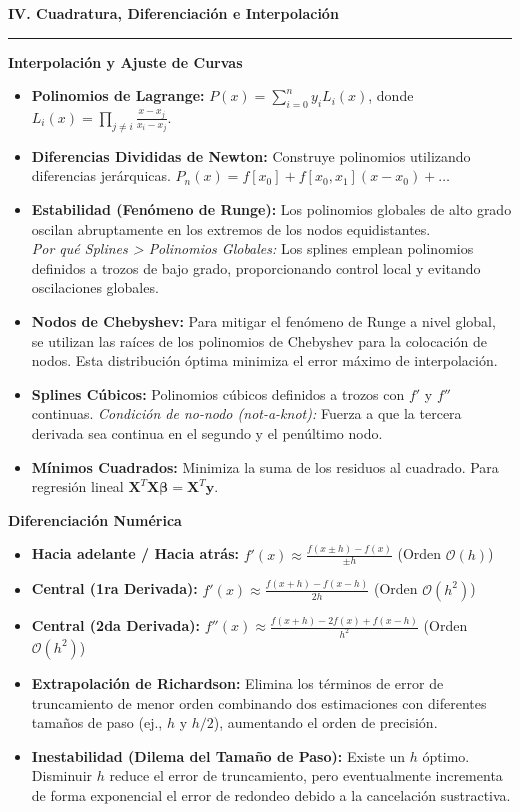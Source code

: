 \documentclass[10pt, landscape, twocolumn]{article}
\newcommand{\cheatsheetsection}[1]{
    \vspace{0.6em}
    {\color{themeblue}\large\bfseries #1} \par
    \vspace{-0.5em}
    {\color{themeblue}\rule{\linewidth}{1pt}} \par
    \vspace{0.2em}
}
\newcommand{\cheatsheetsubsection}[1]{
    \vspace{0.4em}
    {\color{themeblue}\normalsize\bfseries #1} \par
    \vspace{0.1em}
}
\begin{document}
\cheatsheetsection{IV. Cuadratura, Diferenciación e Interpolación}

\cheatsheetsubsection{Interpolación y Ajuste de Curvas}
\begin{itemize}[leftmargin=*, nosep]
    \item \textbf{Polinomios de Lagrange:} $P(x) = \sum_{i=0}^n y_i L_i(x)$, donde $L_i(x) = \prod_{j \neq i} \frac{x - x_j}{x_i - x_j}$.
    \item \textbf{Diferencias Divididas de Newton:} Construye polinomios utilizando diferencias jerárquicas. $P_n(x) = f[x_0] + f[x_0, x_1](x-x_0) + \dots$
    \item \textbf{Estabilidad (Fenómeno de Runge):} Los polinomios globales de alto grado oscilan abruptamente en los extremos de los nodos equidistantes. \\
    \textit{Por qué Splines > Polinomios Globales:} Los splines emplean polinomios definidos a trozos de bajo grado, proporcionando control local y evitando oscilaciones globales.
    \item \textbf{Nodos de Chebyshev:} Para mitigar el fenómeno de Runge a nivel global, se utilizan las raíces de los polinomios de Chebyshev para la colocación de nodos. Esta distribución óptima minimiza el error máximo de interpolación.
    \item \textbf{Splines Cúbicos:} Polinomios cúbicos definidos a trozos con $f'$ y $f''$ continuas. 
    \textit{Condición de no-nodo (not-a-knot):} Fuerza a que la tercera derivada sea continua en el segundo y el penúltimo nodo.
    \item \textbf{Mínimos Cuadrados:} Minimiza la suma de los residuos al cuadrado. Para regresión lineal $\mathbf{X}^T\mathbf{X}\boldsymbol{\beta} = \mathbf{X}^T\mathbf{y}$.
\end{itemize}

\cheatsheetsubsection{Diferenciación Numérica}
\begin{itemize}[leftmargin=*, nosep]
    \item \textbf{Hacia adelante / Hacia atrás:} $f'(x) \approx \frac{f(x \pm h) - f(x)}{\pm h}$ (Orden $\mathcal{O}(h)$)
    \item \textbf{Central (1ra Derivada):} $f'(x) \approx \frac{f(x+h) - f(x-h)}{2h}$ (Orden $\mathcal{O}(h^2)$)
    \item \textbf{Central (2da Derivada):} $f''(x) \approx \frac{f(x+h) - 2f(x) + f(x-h)}{h^2}$ (Orden $\mathcal{O}(h^2)$)
    \item \textbf{Extrapolación de Richardson:} Elimina los términos de error de truncamiento de menor orden combinando dos estimaciones con diferentes tamaños de paso (ej., $h$ y $h/2$), aumentando el orden de precisión.
    \item \textbf{Inestabilidad (Dilema del Tamaño de Paso):} Existe un $h$ óptimo. Disminuir $h$ reduce el error de truncamiento, pero eventualmente incrementa de forma exponencial el error de redondeo debido a la cancelación sustractiva.
\end{itemize}
\end{document}
